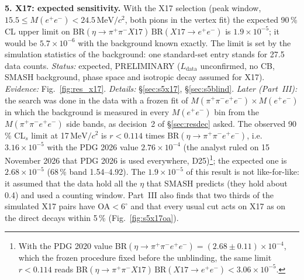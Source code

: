 \documentclass[11pt,a4paper]{article}
\newcommand{\ee}{\ensuremath{e^{+}e^{-}}\xspace}
\newcommand{\pipi}{\ensuremath{\pi^{+}\pi^{-}}\xspace}
\newcommand{\ppee}{\ensuremath{\pi^{+}\pi^{-}e^{+}e^{-}}\xspace}
\newcommand{\Mfour}{\ensuremath{M(\pi^{+}\pi^{-}e^{+}e^{-})}\xspace}
\newcommand{\Mee}{\ensuremath{M(e^{+}e^{-})}\xspace}
\newcommand{\MeVcc}{\ensuremath{\mathrm{MeV}/c^{2}}\xspace}
\newcommand{\Ldata}{\ensuremath{L_{\mathrm{data}}}\xspace}
\begin{document}
\textbf{5. X17: expected sensitivity.} With the X17 selection (peak window, $15.5\le\Mee<24.5$\,\MeVcc, both pions in
the vertex fit) the expected 90\,\% CL upper limit on $\mathrm{BR}(\eta\to\pipi X17)\,\mathrm{BR}(X17\to\ee)$ is
$1.9\times10^{-5}$; it would be $5.7\times10^{-6}$ with the background known exactly. The limit is set by the
simulation statistics of the background: one standard-set entry stands for 27.5 data counts. \emph{Status:} expected,
PRELIMINARY (\Ldata unconfirmed, no CB, SMASH background, phase space and isotropic decay assumed for X17).
\emph{Evidence:} Fig.~\ref{fig:res_x17}. \emph{Details:} \S\ref{sec:s5x17}, \S\ref{sec:s5blind}.
\emph{Later (Part~III):} the search was done in the data with a frozen fit of $\Mfour\times\Mee$ in which the background is
measured in every \Mee bin from the \Mfour side bands, as decision~2 of \S\ref{sec:resdec} asked. The observed 90\,\%
CL$_s$ limit at 17\,\MeVcc is $r<0.114$ times BR$(\eta\to\ppee)$, i.e.\ $3.16\times10^{-5}$ with the PDG 2026 value
$2.76\times10^{-4}$ (the analyst ruled on 15 November 2026 that PDG 2026 is used everywhere, D25)\footnote{\label{fn:x17pdg}With the PDG 2020
value BR$(\eta\to\ppee)=(2.68\pm0.11)\times10^{-4}$, which the frozen procedure fixed before the unblinding, the same limit
$r<0.114$ reads $\mathrm{BR}(\eta\to\pipi X17)\,\mathrm{BR}(X17\to\ee)<3.06\times10^{-5}$.}; the expected one is
$2.68\times10^{-5}$ (68\,\% band 1.54--4.92). The
$1.9\times10^{-5}$ of this result is not like-for-like: it assumed that the data hold all the $\eta$ that SMASH predicts
(they hold about 0.4) and used a counting window. Part~III also finds that two thirds of the simulated X17 pairs have
OA$<6^\circ$ and that every usual cut acts on X17 as on the direct decays within 5\,\% (Fig.~\ref{fig:s5x17oa}).
\end{document}
